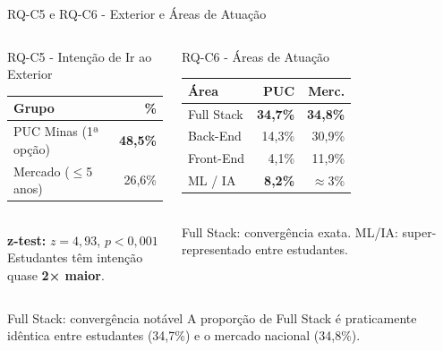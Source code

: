 \documentclass[fleqn]{beamer}
\begin{document}
\begin{frame}{RQ-C5 e RQ-C6 - Exterior e Áreas de Atuação}
\begin{columns}[T]
\begin{block}{RQ-C5 - Intenção de Ir ao Exterior}
\scriptsize
\begin{tabular}{lr}
\toprule
\textbf{Grupo} & \textbf{\%} \\
\midrule
PUC Minas (1ª opção) & \textbf{48,5\%} \\
Mercado ($\leq$5 anos) & 26,6\% \\
\bottomrule
\end{tabular}\\[0.3cm]
\textbf{z-test:} $z = 4{,}93$, $p < 0{,}001$\\
Estudantes têm intenção quase \textbf{2× maior}.
\end{block}

\begin{block}{RQ-C6 - Áreas de Atuação}
\scriptsize
\begin{tabular}{lrr}
\toprule
\textbf{Área} & \textbf{PUC} & \textbf{Merc.} \\
\midrule
Full Stack & \textbf{34,7\%} & \textbf{34,8\%} \\
Back-End & 14,3\% & 30,9\% \\
Front-End & 4,1\% & 11,9\% \\
ML / IA & \textbf{8,2\%} & $\approx$3\% \\
\bottomrule
\end{tabular}\\[0.2cm]
Full Stack: convergência exata. ML/IA: super-representado entre estudantes.
\end{block}
\end{columns}

\vspace{0.3cm}
\begin{exampleblock}{Full Stack: convergência notável}
\footnotesize
A proporção de Full Stack é praticamente idêntica entre estudantes (34,7\%) e o mercado nacional (34,8\%).
\end{exampleblock}
\end{frame}
\end{document}
